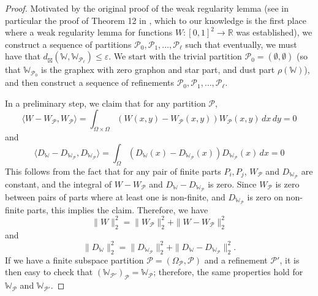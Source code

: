 \documentclass{amsart}
\numberwithin{equation}{section}
\numberwithin{figure}{section}
\theoremstyle{definition}
\theoremstyle{remark}
\newcommand{\eps}{\varepsilon}
\newcommand{\RR}{\mathbb{R}}
\newcommand{\cP}{\mathcal{P}}
\newcommand{\cW}{\mathbb{W}}
\newcommand{\sP}{\mathscr{P}}
\begin{document}
\begin{proof}
Motivated by the original proof of the weak regularity lemma (see in
particular the proof of Theorem 12 in \cite{FK99}, which to our knowledge is
the first place where a weak regularity lemma for functions
$W\colon[0,1]^2\to \RR$ was established), we construct a sequence of
partitions $\sP_0,\sP_1,\dots,\sP_\ell$ such that eventually, we must have
that $d_\boxtimes(\cW,\cW_{\sP_\ell})\leq \eps$. We start with the trivial
partition $\sP_0=(\emptyset,\emptyset)$ (so that $\cW_{\sP_0}$ is the graphex
with zero graphon and star part, and dust part $\rho(\cW)$), and then
construct a sequence of refinements $\sP_0,\sP_1,\dots,\sP_\ell$.

In a preliminary step, we claim that for any partition $\sP$,
\[\langle W-W_\sP,W_\sP\rangle= \int_{\Omega \times \Omega} (W(x,y)-W_\sP(x,y))W_\sP(x,y) \,dx \,dy =0
\] and
\[\langle D_{\cW}-D_{\cW_\sP},D_{\cW_\sP}\rangle=\int_\Omega (D_\cW(x)-D_{\cW_{\sP}}(x))D_{\cW_{\sP}}(x) \,dx =0
\]
This follows from the fact that for any pair of finite parts $P_i,P_j$,
$W_\sP$ and $D_{\cW_\sP}$ are constant, and the integral of $W-W_\sP$ and
$D_{\cW}-D_{\cW_\sP}$ is zero. Since $W_\sP$ is zero between pairs of parts
where at least one is non-finite, and $D_{\cW_\sP}$ is zero on non-finite
parts, this implies the claim. Therefore, we have
\[\|W\|_2^2=\|W_\sP\|_2^2+\|W-W_\sP\|_2^2\]
and
\[\|D_\cW\|_2^2=\|D_{\cW_\sP}\|_2^2+\|D_{\cW}-D_{\cW_\sP}\|_2^2.\]
If we have a finite subspace partition $\sP=(\Omega_{\sP},\cP)$ and a
refinement $\sP'$, it is then easy to check that $(\cW_{\sP'})_\sP=\cW_\sP$;
therefore, the same properties hold for $\cW_\sP$ and $\cW_{\sP'}$.


\end{proof}
\end{document}
